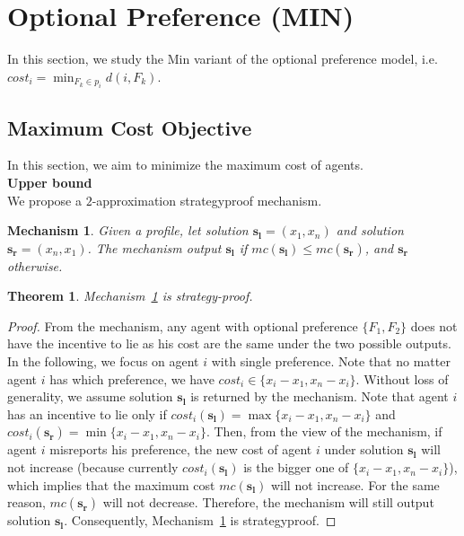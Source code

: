 \documentclass[twoside,11pt]{article}
\newtheorem{theorem}{Theorem}
\newtheorem{mechanism}{Mechanism}
\newcommand{\bd}{\mathbf}
\newcommand{\todo}[1]{}
\renewcommand{\todo}[1]{{\textbf{\color{red} TODO: {#1}}}}
\begin{document}
\section{Optional Preference (MIN)}
\label{sec-min}
In this section, we study the Min variant of the optional preference model, i.e. $cost_{i} = \min_{F_{k} \in p_{i}} d (i, F_{k})$.
\subsection{Maximum Cost Objective}
\label{sec-min-max}
In this section, we aim to minimize the maximum cost of agents.
\\[2ex]
\noindent\textbf{Upper bound}
\\[2ex]
We propose a $2$-approximation strategyproof mechanism.


\begin{mechanism}\label{mech-min-max}%
Given a profile, let solution $\bd{s_l} = (x_1,x_n)$ and solution $\bd{s_r} = (x_n,x_1)$.
The mechanism output $\bd{s_l}$ if $mc(\bd{s_l}) \leq mc(\bd{s_r})$, and $\bd{s_r}$ otherwise.
\end{mechanism}


\begin{theorem}\label{t-min-max-sp}
Mechanism~\ref{mech-min-max} is strategy-proof.
\end{theorem}
\begin{proof}
From the mechanism, any agent with optional preference $\{F_1,F_2\}$ does not have the incentive to lie as his cost are the same under the two possible outputs.
%
In the following, we focus on agent $i$ with single preference. Note that no matter agent $i$ has which preference, we have
$cost_i \in \{x_i-x_1,x_n-x_i\}$.
Without loss of generality, we assume solution $\bd{s_l}$ is returned by the mechanism.
Note that agent $i$ has an incentive to lie only if $cost_i(\bd{s_l}) = \max \{x_i-x_1,x_n-x_i\}$ and $cost_i(\bd{s_r}) = \min \{x_i-x_1,x_n-x_i\}$.
Then, from the view of the mechanism, if agent $i$ misreports his preference, the new cost of agent $i$ under solution $\bd{s_l}$ will not increase (because currently $cost_i(\bd{s_l})$ is the bigger one of $\{x_i-x_1,x_n-x_i\}$), which implies that the maximum cost $mc(\bd{s_l})$ will not increase. For the same reason, $mc(\bd{s_r})$ will not decrease. Therefore, the mechanism will still output solution $\bd{s_l}$.
Consequently, Mechanism~\ref{mech-min-max} is strategyproof.
\end{proof}
\end{document}
